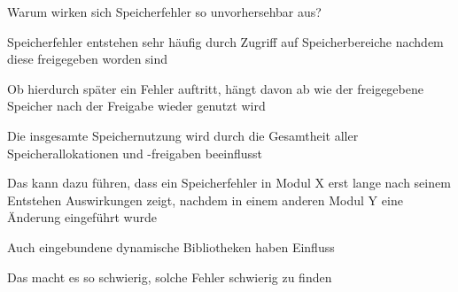 \documentclass[10pt]{article}
\begin{document}
Warum wirken sich Speicherfehler so unvorhersehbar aus?
\begin{itemize*}
  \item Speicherfehler entstehen sehr häufig durch Zugriff auf Speicherbereiche nachdem diese freigegeben worden sind
  \item Ob hierdurch später ein Fehler auftritt, hängt davon ab wie der freigegebene Speicher nach der Freigabe wieder genutzt wird
  \item Die insgesamte Speichernutzung wird durch die Gesamtheit aller Speicherallokationen und -freigaben beeinflusst
  \item Das kann dazu führen, dass ein Speicherfehler in Modul X erst lange nach seinem Entstehen Auswirkungen zeigt, nachdem in einem anderen Modul Y eine Änderung eingeführt wurde
  \item Auch eingebundene dynamische Bibliotheken haben Einfluss
  \item Das macht es so schwierig, solche Fehler schwierig zu finden
\end{itemize*}
\end{document}
